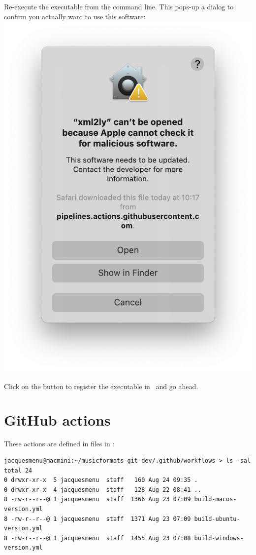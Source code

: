 Re-execute the executable from the command line. This pops-up a dialog to confirm you actually want to use this software:\\
\includegraphics[scale=0.35]{../mfgraphics/mfgraphicsMacOSConfirmOpening.png}

Click on the  button to register the executable in \Gatekeeper\ and go ahead.





\section{GitHub actions}

These actions are defined in  files in :
\begin{lstlisting}[language=Terminal]
jacquesmenu@macmini:~/musicformats-git-dev/.github/workflows > ls -sal
total 24
0 drwxr-xr-x  5 jacquesmenu  staff   160 Aug 24 09:35 .
0 drwxr-xr-x  4 jacquesmenu  staff   128 Aug 22 08:41 ..
8 -rw-r--r--@ 1 jacquesmenu  staff  1366 Aug 23 07:09 build-macos-version.yml
8 -rw-r--r--@ 1 jacquesmenu  staff  1371 Aug 23 07:09 build-ubuntu-version.yml
8 -rw-r--r--@ 1 jacquesmenu  staff  1455 Aug 23 07:08 build-windows-version.yml
\end{lstlisting}


